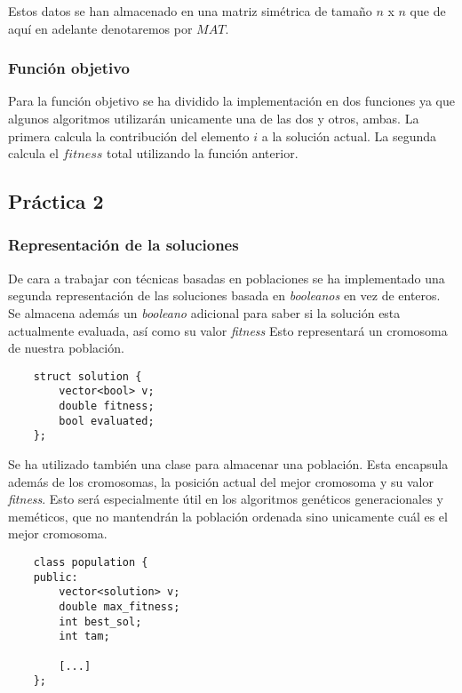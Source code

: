 \documentclass[11pt,a4paper]{article}
\begin{document}
	Estos datos se han almacenado en una matriz simétrica de tamaño $n$ x $n$ que de aquí en adelante denotaremos por $MAT$.
	
	\subsubsection{Función objetivo}
	
	Para la función objetivo se ha dividido la implementación en dos funciones ya que algunos algoritmos utilizarán unicamente una de las dos y otros, ambas. La primera calcula la contribución del elemento $i$ a la solución actual. La segunda calcula el $fitness$ total utilizando la función anterior. \\

	\subsection{Práctica 2} \label{sec32}
	
	\subsubsection{Representación de la soluciones}
	
	De cara a trabajar con técnicas basadas en poblaciones se ha implementado una segunda representación de las soluciones basada en \emph{booleanos} en vez de enteros. Se almacena además un \emph{booleano} adicional para saber si la solución esta actualmente evaluada, así como su valor \emph{fitness} Esto representará un cromosoma de nuestra población.
	
	\begin{lstlisting}
	struct solution {
		vector<bool> v;
		double fitness;
		bool evaluated;
	};
	\end{lstlisting}
	
	Se ha utilizado también una clase para almacenar una población. Esta encapsula además de los cromosomas, la posición actual del mejor cromosoma y su valor \emph{fitness}. Esto será especialmente útil en los algoritmos genéticos generacionales y meméticos, que no mantendrán la población ordenada sino unicamente cuál es el mejor cromosoma.
	
	\begin{lstlisting}
	class population {
	public:
		vector<solution> v;
		double max_fitness;
		int best_sol;
		int tam;
		
		[...]
	};
	\end{lstlisting}
	
\end{document}
